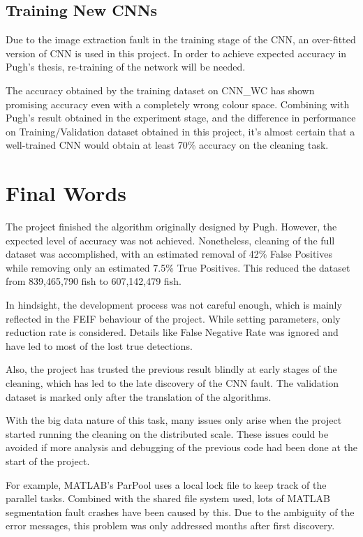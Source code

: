\documentclass[bsc,logo,twoside,fullspacing,parskip]{infthesis}
\begin{document}
\subsection{Training New CNNs}

Due to the image extraction fault in the training stage of the CNN, an over-fitted version of CNN is used in this project. 
In order to achieve expected accuracy in Pugh's thesis\cite{Pugh}, re-training of the network will be needed.

The accuracy obtained by the training dataset on CNN\_WC has shown promising accuracy even with a completely wrong colour space. Combining with Pugh's result obtained in the experiment stage, and the difference in performance on Training/Validation dataset obtained in this project, it's almost certain that a well-trained CNN would obtain at least 70\% accuracy on the cleaning task. 

\section{Final Words}

The project finished the algorithm originally designed by Pugh. However, the expected level of accuracy was not achieved.
Nonetheless, cleaning of the full dataset was accomplished, with an estimated removal of 42\% False Positives while removing only an estimated 7.5\% True Positives. This reduced the dataset from 839,465,790 fish to 607,142,479 fish.

In hindsight, the development process was not careful enough, which is mainly reflected in the FEIF behaviour of the project. 
While setting parameters, only reduction rate is considered. 
Details like False Negative Rate was ignored and have led to most of the lost true detections.

Also, the project has trusted the previous result blindly at early stages of the cleaning, which has led to the late discovery of the CNN fault.
The validation dataset is marked only after the translation of the algorithms.

With the big data nature of this task, many issues only arise when the project started running the cleaning on the distributed scale.
These issues could be avoided if more analysis and debugging of the previous code had been done at the start of the project.

For example, MATLAB's ParPool uses a local lock file to keep track of the parallel tasks. 
Combined with the shared file system used, lots of MATLAB segmentation fault crashes have been caused by this. 
Due to the ambiguity of the error messages, this problem was only addressed months after first discovery.
\end{document}
